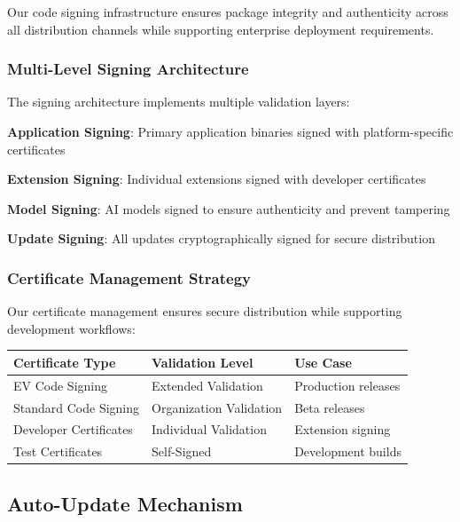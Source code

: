 Our code signing infrastructure ensures package integrity and authenticity across all distribution channels while supporting enterprise deployment requirements.

\subsubsection*{Multi-Level Signing Architecture}

The signing architecture implements multiple validation layers:

\begin{expandedlist}
    \item \textbf{Application Signing}: Primary application binaries signed with platform-specific certificates
    \item \textbf{Extension Signing}: Individual extensions signed with developer certificates
    \item \textbf{Model Signing}: AI models signed to ensure authenticity and prevent tampering
    \item \textbf{Update Signing}: All updates cryptographically signed for secure distribution
\end{expandedlist}

\subsubsection*{Certificate Management Strategy}

Our certificate management ensures secure distribution while supporting development workflows:

\begin{center}
\begin{tabular}{@{}lll@{}}
\toprule
\textbf{Certificate Type} & \textbf{Validation Level} & \textbf{Use Case} \\
\midrule
EV Code Signing & Extended Validation & Production releases \\
Standard Code Signing & Organization Validation & Beta releases \\
Developer Certificates & Individual Validation & Extension signing \\
Test Certificates & Self-Signed & Development builds \\
\bottomrule
\end{tabular}
\end{center}

\subsection*{Auto-Update Mechanism}

